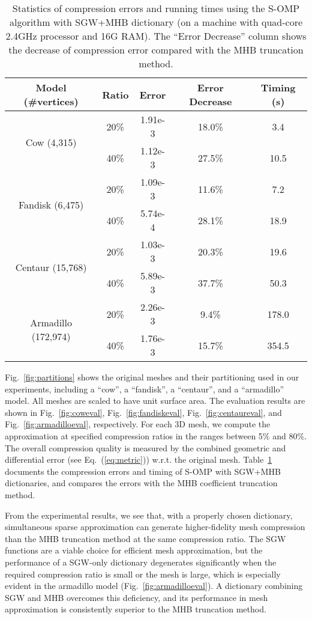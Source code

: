 \begin{table}[th]
\centering
\begin{tabular}{ |c|c|c|c|c| }
\hline
Model (\#vertices) & Ratio & Error & Error Decrease & Timing (s) \\
\hline
\multirow{2}{*}{Cow (4,315)} & 20\% & 1.91e-3 & 18.0\% & 3.4 \\
                             & 40\% & 1.12e-3 & 27.5\% & 10.5 \\
\hline
\multirow{2}{*}{Fandisk (6,475)} & 20\% & 1.09e-3 & 11.6\% & 7.2 \\
                                 & 40\% & 5.74e-4 & 28.1\% & 18.9 \\
\hline
\multirow{2}{*}{Centaur (15,768)} & 20\% & 1.03e-3 & 20.3\% & 19.6 \\
                                  & 40\% & 5.89e-3 & 37.7\% & 50.3 \\
\hline
\multirow{2}{*}{Armadillo (172,974)} & 20\% & 2.26e-3 & 9.4\% & 178.0 \\
                                     & 40\% & 1.76e-3 & 15.7\% & 354.5 \\
\hline
\end{tabular}
\caption[Statistics of compression errors and running times using different dictionary.]
{Statistics of compression errors and
    running times using the S-OMP algorithm with SGW+MHB dictionary
    (on a machine with quad-core 2.4GHz processor and 16G RAM).
    The ``Error Decrease'' column shows the decrease of compression
    error compared with the MHB truncation method.}
\label{tab:stat}
\end{table}

Fig.~\ref{fig:partitions} shows the original meshes and their
partitioning used in our experiments, including a ``cow'', a
``fandisk'', a ``centaur'', and a ``armadillo'' model. All meshes are
scaled to have unit surface area. The evaluation results are shown in
Fig.~\ref{fig:coweval}, Fig.~\ref{fig:fandiskeval},
Fig.~\ref{fig:centaureval}, and Fig.~\ref{fig:armadilloeval},
respectively. For each 3D mesh, we compute the approximation at
specified compression ratios in the ranges between 5\% and 80\%. The
overall compression quality is measured by the combined geometric and
differential error (see Eq.~(\ref{eq:metric})) w.r.t. the original
mesh. Table~\ref{tab:stat} documents the compression errors and timing
of S-OMP with SGW+MHB dictionaries, and compares the errors with the
MHB coefficient truncation method.

From the experimental results, we see that, with a properly
chosen dictionary, simultaneous sparse approximation can generate
higher-fidelity mesh compression than the MHB truncation method at the
same compression ratio. The SGW functions are a viable choice for
efficient mesh approximation, but the performance of a SGW-only
dictionary degenerates significantly when the required compression
ratio is small or the mesh is large, which is especially evident in the armadillo
model (Fig.~\ref{fig:armadilloeval}). A dictionary combining SGW and MHB
overcomes this deficiency, and its performance in mesh approximation
is consistently superior to the MHB truncation method.

